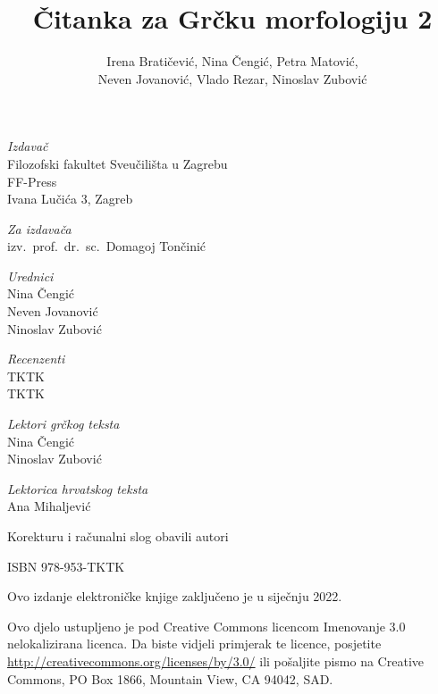 \documentclass[a4paper,12pt,twoside]{report}
\def\secondpage{\clearpage\null\vfill
\pagestyle{empty}
\begin{minipage}[b]{0.9\textwidth}
\begin{center}
\textit{Izdavač}\\
Filozofski fakultet Sveučilišta u Zagrebu\\
FF-Press\\
Ivana Lučića 3, Zagreb

\bigskip

\textit{Za izdavača}\\
izv.\ prof.\ dr.\ sc.\ Domagoj Tončinić

\bigskip

\textit{Urednici}\\
Nina Čengić\\
Neven Jovanović\\
Ninoslav Zubović

\bigskip

\textit{Recenzenti}\\
TKTK\\
TKTK

\bigskip

\textit{Lektori grčkog teksta}\\
Nina Čengić\\
Ninoslav Zubović

\textit{Lektorica hrvatskog teksta}\\
Ana Mihaljević

\bigskip

Korekturu i računalni slog obavili autori

\bigskip

ISBN 978-953-TKTK

\bigskip

Ovo izdanje elektroničke knjige zaključeno je u siječnju 2022.




\end{center}
\footnotesize\raggedright
\setlength{\parskip}{0.5\baselineskip}
\noindent Ovo djelo ustupljeno je pod Creative Commons licencom Imenovanje 3.0 nelokalizirana licenca. Da biste vidjeli primjerak te licence, posjetite \url{http://creativecommons.org/licenses/by/3.0/} ili pošaljite pismo na Creative Commons, PO Box 1866, Mountain View, CA 94042, SAD. 

\end{minipage}
\vspace*{3\baselineskip}
}
\begin{document}
\title{Čitanka za Grčku morfologiju 2}
\author{Irena Bratičević, Nina Čengić, Petra Matović, \\Neven Jovanović, Vlado Rezar, Ninoslav Zubović}
\date{}
\secondpage
\end{document}
